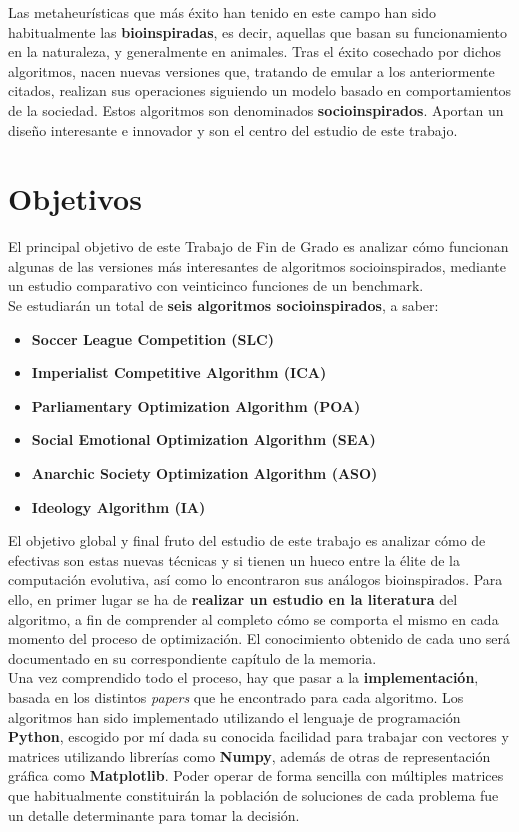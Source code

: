 Las metaheurísticas que más éxito han tenido en este campo han sido habitualmente las \textbf{bioinspiradas}, es decir, aquellas que basan su funcionamiento en la naturaleza, y generalmente en animales. Tras el éxito cosechado por dichos algoritmos, nacen nuevas versiones que, tratando de emular a los anteriormente citados, realizan sus operaciones siguiendo un modelo basado en comportamientos de la sociedad. Estos algoritmos son denominados \textbf{socioinspirados}. Aportan un diseño interesante e innovador y son el centro del estudio de este trabajo.

\section{Objetivos}

El principal objetivo de este Trabajo de Fin de Grado es analizar cómo funcionan algunas de las versiones más interesantes de algoritmos socioinspirados, mediante un estudio comparativo con veinticinco funciones de un benchmark. \\

Se estudiarán un total de \textbf{seis algoritmos socioinspirados}, a saber:

\begin{itemize}
	\item \textbf{Soccer League Competition (SLC)}
	\item \textbf{Imperialist Competitive Algorithm (ICA)}
	\item \textbf{Parliamentary Optimization Algorithm (POA)}
	\item \textbf{Social Emotional Optimization Algorithm (SEA)}
	\item \textbf{Anarchic Society Optimization Algorithm (ASO)}
	\item \textbf{Ideology Algorithm (IA)}
\end{itemize}

El objetivo global y final fruto del estudio de este trabajo es analizar cómo de efectivas son estas nuevas técnicas y si tienen un hueco entre la élite de la computación evolutiva, así como lo encontraron sus análogos bioinspirados. Para ello, en primer lugar se ha de \textbf{realizar un estudio en la literatura} del algoritmo, a fin de comprender al completo cómo se comporta el mismo en cada momento del proceso de optimización. El conocimiento obtenido de cada uno será documentado en su correspondiente capítulo de la memoria.\\

Una vez comprendido todo el proceso, hay que pasar a la \textbf{implementación}, basada en los distintos \textit{papers} que he encontrado para cada algoritmo. Los algoritmos han sido implementado utilizando el lenguaje de programación \textbf{Python}, escogido por mí dada su conocida facilidad para trabajar con vectores y matrices utilizando librerías como \textbf{Numpy}, además de otras de representación gráfica como \textbf{Matplotlib}. Poder operar de forma sencilla con múltiples matrices que habitualmente constituirán la población de soluciones de cada problema fue un detalle determinante para tomar la decisión.\\

